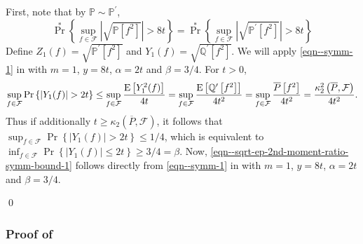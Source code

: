 First, note that by \(\mathbb{P} \sim \mathbb{P}^{\prime}\),
\begin{equation*}
  \Pr^{\ast} \left\{ \sup_{f \in \mathcal{F}} \left| \sqrt{\mathbb{P} \left[
  f^{2} \right]} \right| > 8 t \right\} =
  \Pr^{\ast} \left\{ \sup_{f \in \mathcal{F}} \left| \sqrt{\mathbb{P}^{\prime}
  \left[ f^{2} \right]} \right| > 8 t \right\}
\end{equation*}
Define \(Z_{1} (f) = \sqrt{\mathbb{P}^{\prime} \left[ f^{2} \right]}\) and
\(Y_{1} (f) = \sqrt{\mathbb{Q}^{\prime} \left[ f^{2} \right]}\).
We will apply \eqref{eqn--symm-1} in  with \(m = 1\), \(y = 8
t\), \(\alpha = 2 t\) and \(\beta = 3 / 4\).
For \(t > 0\),
\begin{equation*}
  \sup_{f \in \mathcal{F}} \mathrm{Pr} \left\{ \left| Y_{1} (f) \right| > 2 t
  \right\} \leq \sup_{f \in \mathcal{F}} \frac{\mathrm{E} \left[ Y_{1}^{2} (f)
  \right]}{4 t} = \sup_{f \in \mathcal{F}} \frac{\mathrm{E} \left[ \mathbb{Q}^{\prime}
  \left[ f^{2} \right] \right]}{4 t^{2}} = \sup_{f \in \mathcal{F}}
  \frac{\overline{P} \left[ f^{2} \right]}{4 t^{2}} = \frac{\kappa_{2}^{2}
  \left( \overline{P}, \mathcal{F} \right)}{4 t^{2}}.
\end{equation*}
Thus if additionally \(t \geq \kappa_{2} \left( \overline{P}, \mathcal{F}
\right)\), it follows that \(\sup_{f \in \mathcal{F}} \Pr \left\{ \left| Y_{1}
(f) \right| > 2 t \right\} \leq 1 / 4\), which is equivalent to \(\inf_{f \in
\mathcal{F}} \Pr \left\{ \left| Y_{1} (f) \right| \leq 2 t \right\} \geq 3 / 4 =
\beta\).
Now, \eqref{eqn--sqrt-ep-2nd-moment-ratio-symm-bound-1} follows directly from
\eqref{eqn--symm-1} in  with \(m = 1\), \(y = 8
t\), \(\alpha = 2 t\) and \(\beta = 3 / 4\).

\qed

\subsubsection{Proof of
\texorpdfstring{}{Lemma
\ref{lem--sqrt-ep-2nd-moment-ratio-symm-single}}}
\label{sec--prf--lem--sqrt-ep-2nd-moment-ratio-symm-single}

